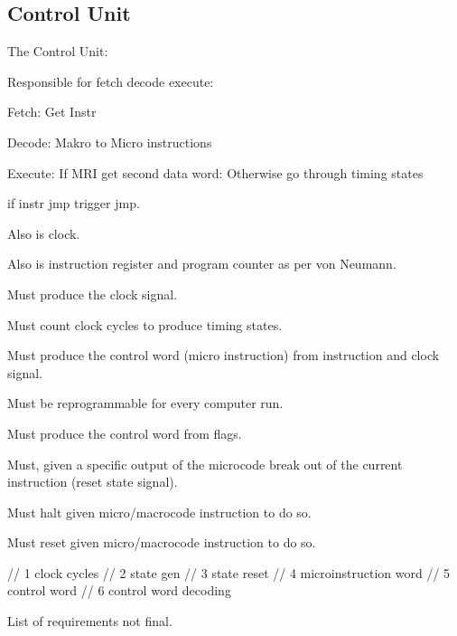 \subsection{Control Unit}

The Control Unit:

Responsible for fetch decode execute:  

Fetch: Get Instr

Decode: Makro to Micro instructions

Execute: If MRI get second data word: 
Otherwise go through timing states

if instr jmp trigger jmp. 

Also is clock. 

Also is instruction register and program counter as per von Neumann.


\begin{arch-requirement}
  Must produce the clock signal. 
\end{arch-requirement}

\begin{arch-requirement}
  Must count clock cycles to produce timing states.
\end{arch-requirement}

\begin{arch-requirement}
  Must produce the control word (micro instruction) from instruction and clock signal.
\end{arch-requirement}

\begin{arch-requirement}
  Must be reprogrammable for every computer run.
\end{arch-requirement}

\begin{turing-requirement}
  Must produce the control word from flags.
\end{turing-requirement}

\begin{feat-requirement}
  Must, given a specific output of the microcode break out of the current instruction (reset state signal).
\end{feat-requirement}

\begin{feat-requirement}
  Must halt given micro/macrocode instruction to do so. 
\end{feat-requirement}

\begin{feat-requirement}
  Must reset given micro/macrocode instruction to do so. 
\end{feat-requirement}
// 1 clock cycles
    // 2 state gen
    // 3 state reset
    // 4 microinstruction word
    // 5 control word
    // 6 control word decoding
    
List of requirements not final.


